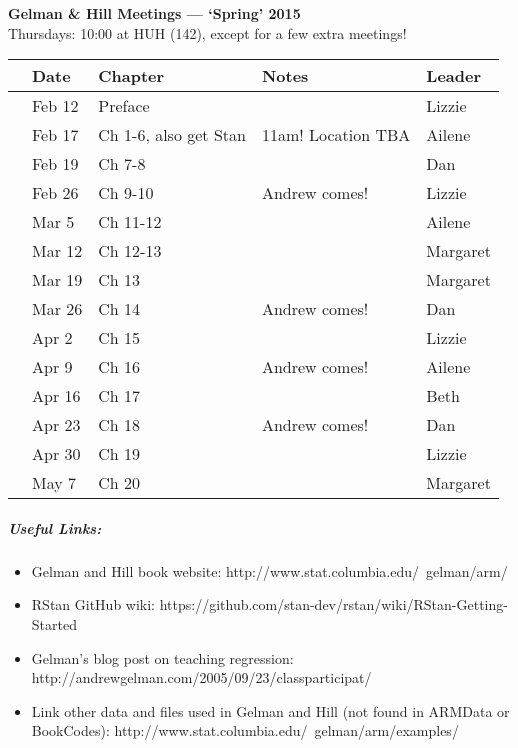 \documentclass[11pt]{article}
\begin{document}
 
\raggedright
{}

\begin{center} 
{\large \textbf{Gelman \& Hill Meetings --- `Spring' 2015}} \\ [2pt]
Thursdays: 10:00 at HUH (142), except for a few extra meetings!\\
\end{center} 

\begin{center}
\begin{tabular}{ p{0.7 cm}  p{1.5 cm}  p{5 cm}  p{5 cm}  p{1.5 cm} }  \hline \hline
 & \textbf{Date}
   & \textbf{Chapter}
      & \textbf{Notes} 
         & \textbf{Leader} \\ 
\hline \hline
 & Feb 12  &  Preface&        & Lizzie \\\hline
 & Feb 17  & Ch 1-6, also get Stan   &  11am! Location TBA & Ailene  \\\hline
 & Feb 19  & Ch 7-8 &      & Dan \\\hline
 & Feb 26 & Ch 9-10 &  Andrew comes! & Lizzie  \\\hline
 & Mar 5 & Ch 11-12 &        & Ailene   \\\hline
 & Mar 12 & Ch 12-13 &  & Margaret \\\hline
 & Mar 19 & Ch 13 &        & Margaret \\\hline
 & Mar 26 & Ch 14 &  Andrew comes! & Dan  \\\hline
 & Apr 2& Ch 15   &  & Lizzie  \\\hline
 & Apr 9 & Ch 16   &  Andrew comes!& Ailene  \\\hline
 & Apr 16 &Ch 17 &  & Beth  \\\hline
 & Apr 23 & Ch 18 & Andrew comes!& Dan \\\hline
 & Apr 30& Ch 19  & & Lizzie\\\hline
 & May 7& Ch 20  & & Margaret \\\hline

\hline
\end{tabular}
\end{center}
\subparagraph{Useful Links:} 
\begin{itemize}
\item Gelman and Hill book website: http://www.stat.columbia.edu/~gelman/arm/
\item RStan GitHub wiki: https://github.com/stan-dev/rstan/wiki/RStan-Getting-Started
\item Gelman's blog post on teaching regression: http://andrewgelman.com/2005/09/23/classparticipat/
\item Link other data and files used in Gelman and Hill (not found in ARMData or BookCodes): http://www.stat.columbia.edu/~gelman/arm/examples/
\end{itemize}
\end{document}
